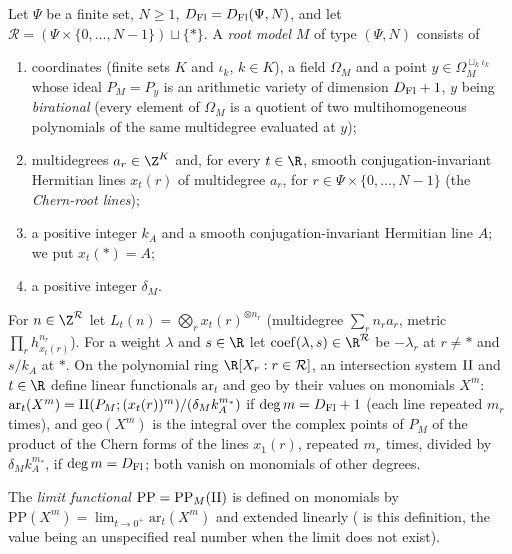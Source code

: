 \begin{definition}\label{def:pf:deepstr:rootmodel}
Let $\Psi$ be a finite set, $N\ge1$, $D_{\mathrm{Fl}}=D_{\mathrm{Fl}}(\Psi,N)$, and let $\mathcal R=(\Psi\times\{0,\dots,N-1\})\sqcup\{\ast\}$.
A \emph{root model} $M$ of type $(\Psi,N)$ consists of
\begin{enumerate}[label=(\roman*)]
\item coordinates (finite sets $K$ and $\iota_k$, $k\in K$), a field $\Omega_M$ and a point $y\in\Omega_M^{\sqcup_k\iota_k}$
whose ideal $P_M=P_y$ is an arithmetic variety of dimension $D_{\mathrm{Fl}}+1$, $y$ being \emph{birational}
(every element of $\Omega_M$ is a quotient of two multihomogeneous polynomials of the same multidegree
evaluated at $y$);
\item multidegrees $a_r\in\Z^K$ and, for every $t\in\R$, smooth conjugation-invariant Hermitian lines
$x_t(r)$ of multidegree $a_r$, for $r\in\Psi\times\{0,\dots,N-1\}$ (the \emph{Chern-root lines});
\item a positive integer $k_A$ and a smooth conjugation-invariant Hermitian line $A$; we put
$x_t(\ast)=A$;
\item a positive integer $\delta_M$.
\end{enumerate}
For $n\in\Z^{\mathcal R}$ let $L_t(n)=\bigotimes_rx_t(r)^{\otimes n_r}$ (multidegree $\sum_rn_ra_r$, metric
$\prod_rh_{x_t(r)}^{n_r}$). For a weight $\lambda$ and $s\in\R$ let $\mathrm{coef}(\lambda,s)\in\R^{\mathcal R}$ be
$-\lambda_r$ at $r\ne\ast$ and $s/k_A$ at $\ast$. On the polynomial ring $\R[X_r:r\in\mathcal R]$, an
intersection system $\mathrm{II}$ and $t\in\R$ define linear functionals $\mathrm{ar}_t$ and $\mathrm{geo}$
by their values on monomials $X^m$: $\mathrm{ar}_t(X^m)=\mathrm{II}(P_M;(x_t(r))^{m})/(\delta_Mk_A^{m_\ast})$
if $\deg m=D_{\mathrm{Fl}}+1$ (each line repeated $m_r$ times), and $\mathrm{geo}(X^m)$ is the integral over the
complex points of $P_M$ of the product of the Chern forms of the lines $x_1(r)$, repeated $m_r$ times,
divided by $\delta_Mk_A^{m_\ast}$, if $\deg m=D_{\mathrm{Fl}}$; both vanish on monomials of other degrees.
\end{definition}

The \emph{limit functional} $\mathrm{PP}=\mathrm{PP}_M(\mathrm{II})$ is defined on monomials by
$\mathrm{PP}(X^m)=\lim_{t\to0^+}\mathrm{ar}_t(X^m)$ and extended linearly
( is this definition, the value being an
unspecified real number when the limit does not exist).

